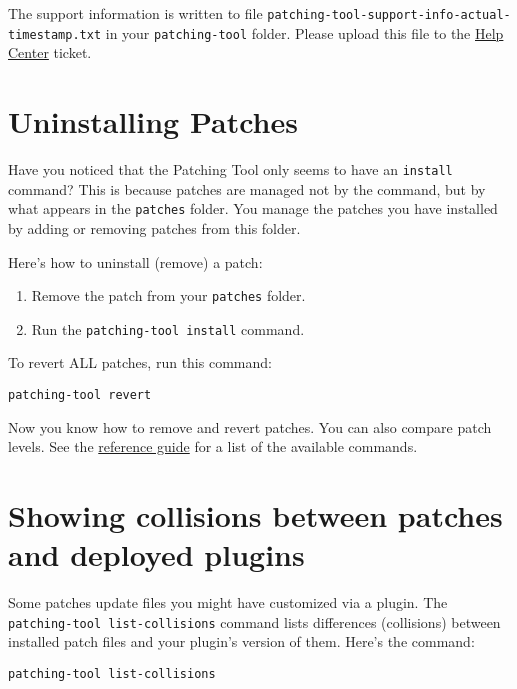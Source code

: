 The support information is written to file
\texttt{patching-tool-support-info-actual-timestamp.txt} in your
\texttt{patching-tool} folder. Please upload this file to the
\href{https://help.liferay.com/hc}{Help Center} ticket.

\section{Uninstalling Patches}\label{uninstalling-patches}

Have you noticed that the Patching Tool only seems to have an
\texttt{install} command? This is because patches are managed not by the
command, but by what appears in the \texttt{patches} folder. You manage
the patches you have installed by adding or removing patches from this
folder.

Here's how to uninstall (remove) a patch:

\begin{enumerate}
\def\labelenumi{\arabic{enumi}.}
\item
  Remove the patch from your \texttt{patches} folder.
\item
  Run the \texttt{patching-tool\ install} command.
\end{enumerate}

To revert ALL patches, run this command:

\begin{verbatim}
patching-tool revert
\end{verbatim}

Now you know how to remove and revert patches. You can also compare
patch levels. See the
\href{/docs/7-2/deploy/-/knowledge_base/d/comparing-patch-levels}{reference
guide} for a list of the available commands.

\section{Showing collisions between patches and deployed
plugins}\label{showing-collisions-between-patches-and-deployed-plugins}

Some patches update files you might have customized via a plugin. The
\texttt{patching-tool\ list-collisions} command lists differences
(collisions) between installed patch files and your plugin's version of
them. Here's the command:

\begin{verbatim}
patching-tool list-collisions
\end{verbatim}

